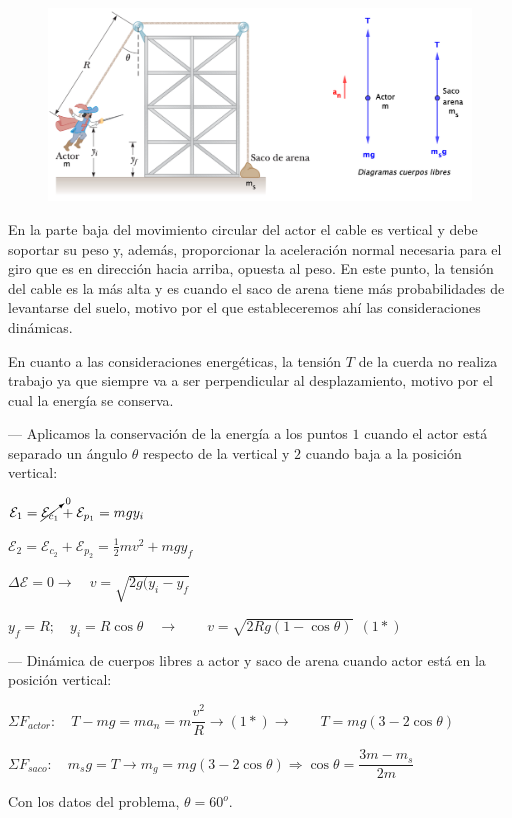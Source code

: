 \begin{figure}[H]
	\centering
	\includegraphics[width=1\textwidth]{imagenes/imagenes04/T04IM24.png}
\end{figure}

En la parte baja del movimiento circular del actor el cable es vertical y debe soportar su peso y, además, proporcionar la aceleración normal necesaria para el giro que es en dirección hacia arriba, opuesta al peso. En este punto, la tensión del cable es la más alta y es cuando el saco de arena tiene más probabilidades de levantarse del suelo, motivo por el que estableceremos ahí las consideraciones dinámicas.

En cuanto a las consideraciones energéticas, la tensión $T$ de la cuerda no realiza trabajo ya que siempre va a ser perpendicular al desplazamiento, motivo por el cual la energía se conserva. 

--- Aplicamos la conservación de la energía a los puntos $1$ cuando el actor está separado un ángulo $\theta$ respecto de la vertical y $2$ cuando baja a la posición vertical:

$\mathcal E_1=\cancelto{0}{\mathcal E_{c_1}}+\mathcal E_{p_1}=mgy_i$

$\mathcal E_2=\mathcal E_{c_2}+\mathcal E_{p_2}=\frac 1 2 m v^2+ mgy_f$

$\Delta \mathcal E=0 \to \quad v=\sqrt{2g(y_i-y_f}$

$y_f=R; \quad y_i=R\cos \theta \quad \to \qquad  v=\sqrt{2Rg(1-\cos \theta)} \ \ (1*)$

--- Dinámica de cuerpos libres a  actor y saco de arena cuando actor está en la posición vertical:

$\Sigma F_{actor}: \quad T-mg=ma_n=m\dfrac{v^2}R
\to (1*) \to \qquad T=mg(3-2\cos \theta)$


$\Sigma F_{saco}: \quad m_sg=T \to m_g=mg(3-2\cos \theta) \Rightarrow \cos \theta=\dfrac{3m-m_s}{2m}$

Con los datos del problema, $\theta=60^o$.


